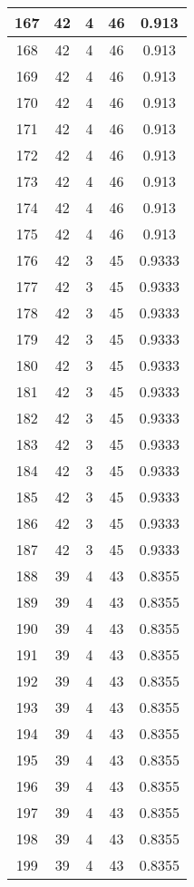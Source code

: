 \documentclass[letterpaper, 12pt]{article}
\begin{document}
\begin{longtable}{|c|c|c|c|c|}
\hline
167 & 42 & 4 & 46 & 0.913 \\
\hline
168 & 42 & 4 & 46 & 0.913 \\
\hline
169 & 42 & 4 & 46 & 0.913 \\
\hline
170 & 42 & 4 & 46 & 0.913 \\
\hline
171 & 42 & 4 & 46 & 0.913 \\
\hline
172 & 42 & 4 & 46 & 0.913 \\
\hline
173 & 42 & 4 & 46 & 0.913 \\
\hline
174 & 42 & 4 & 46 & 0.913 \\
\hline
175 & 42 & 4 & 46 & 0.913 \\
\hline
176 & 42 & 3 & 45 & 0.9333 \\
\hline
177 & 42 & 3 & 45 & 0.9333 \\
\hline
178 & 42 & 3 & 45 & 0.9333 \\
\hline
179 & 42 & 3 & 45 & 0.9333 \\
\hline
180 & 42 & 3 & 45 & 0.9333 \\
\hline
181 & 42 & 3 & 45 & 0.9333 \\
\hline
182 & 42 & 3 & 45 & 0.9333 \\
\hline
183 & 42 & 3 & 45 & 0.9333 \\
\hline
184 & 42 & 3 & 45 & 0.9333 \\
\hline
185 & 42 & 3 & 45 & 0.9333 \\
\hline
186 & 42 & 3 & 45 & 0.9333 \\
\hline
187 & 42 & 3 & 45 & 0.9333 \\
\hline
188 & 39 & 4 & 43 & 0.8355 \\
\hline
189 & 39 & 4 & 43 & 0.8355 \\
\hline
190 & 39 & 4 & 43 & 0.8355 \\
\hline
191 & 39 & 4 & 43 & 0.8355 \\
\hline
192 & 39 & 4 & 43 & 0.8355 \\
\hline
193 & 39 & 4 & 43 & 0.8355 \\
\hline
194 & 39 & 4 & 43 & 0.8355 \\
\hline
195 & 39 & 4 & 43 & 0.8355 \\
\hline
196 & 39 & 4 & 43 & 0.8355 \\
\hline
197 & 39 & 4 & 43 & 0.8355 \\
\hline
198 & 39 & 4 & 43 & 0.8355 \\
\hline
199 & 39 & 4 & 43 & 0.8355 \\
\hline
\end{longtable}
\end{document}
